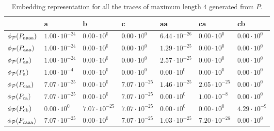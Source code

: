 \begin{table}[!t]
	\centering
	\caption{Embedding representation for all the traces of maximum length $4$ generated from $P$.}\label{tab:emb2}
	\begin{tabular}{l|l|l|l|l|l|l|}
		\toprule
		& a    & b                                                   & c    & aa   & ca   & cb   \\
		\midrule
		
		
		$\phi_{\mathcal{P}}(P_\textup{aaaa})$ & $1.00\cdot 10^{-24}$ & $0.00\cdot 10^{0}$ & $0.00\cdot 10^{0}$& $6.44\cdot 10^{-26}$& $0.00\cdot 10^{0}$& $0.00\cdot 10^{0}$\\
		$\phi_{\mathcal{P}}(P_\textup{aaa})$ & $1.00\cdot 10^{-24}$ & $0.00\cdot 10^{0}$ & $0.00\cdot 10^{0}$& $1.29\cdot 10^{-25}$& $0.00\cdot 10^{0}$& $0.00\cdot 10^{0}$\\
		$\phi_{\mathcal{P}}(P_\textup{aa})$ & $1.00\cdot 10^{-24}$ & $0.00\cdot 10^{0}$ & $0.00\cdot 10^{0}$& $2.57\cdot 10^{-25}$& $0.00\cdot 10^{0}$& $0.00\cdot 10^{0}$\\
		$\phi_{\mathcal{P}}(P_\textup{a})$ & $1.00\cdot 10^{-4}$ & $0.00\cdot 10^{0}$ & $0.00\cdot 10^{0}$& $0.00\cdot 10^{0}$& $0.00\cdot 10^{0}$& $0.00\cdot 10^{0}$\\
		$\phi_{\mathcal{P}}(P_\textup{caa})$ & $7.07\cdot 10^{-25}$ & $0.00\cdot 10^{0}$ & $7.07\cdot 10^{-25}$& $1.46\cdot 10^{-25}$& $2.05\cdot 10^{-25}$& $0.00\cdot 10^{0}$\\
		$\phi_{\mathcal{P}}(P_\textup{ca})$ & $7.07\cdot 10^{-25}$ & $0.00\cdot 10^{0}$ & $7.07\cdot 10^{-25}$& $0.00\cdot 10^{0}$& $1.00\cdot 10^{-8}$& $0.00\cdot 10^{0}$\\
		$\phi_{\mathcal{P}}(P_\textup{cb})$ &  $0.00\cdot 10^{0}$ & $7.07\cdot 10^{-25}$ & $7.07\cdot 10^{-25}$& $0.00\cdot 10^{0}$&  $0.00\cdot 10^{0}$ & $4.29\cdot 10^{-9}$\\
		$\phi_{\mathcal{P}}(P_\textup{caaa})$  & $7.07\cdot 10^{-25}$ &  $0.00\cdot 10^{0}$ & $7.07\cdot 10^{-25}$& $1.03\cdot 10^{-25}$&  $7.20\cdot 10^{-26}$ & $0.00\cdot 10^{0}$\\
		\bottomrule
	\end{tabular}
\end{table}

